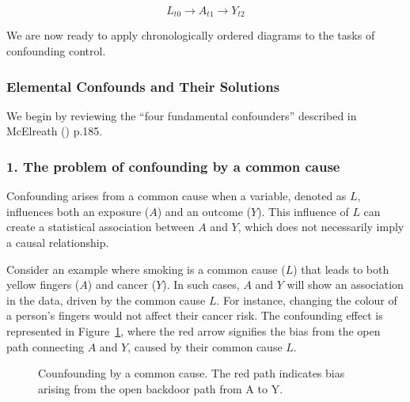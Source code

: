 \documentclass[
  singlecolumn,
  9pt]{article}
\begin{document}
\[L_{t0} \to A_{t1} \to Y_{t2}\]

We are now ready to apply chronologically ordered diagrams to the tasks
of confounding control.

\subsubsection{Elemental Confounds and Their
Solutions}\label{elemental-confounds-and-their-solutions}

We begin by reviewing the ``four fundamental confounders'' described in
McElreath () p.185.

\subsubsection{1. The problem of confounding by a common
cause}\label{the-problem-of-confounding-by-a-common-cause}

Confounding arises from a common cause when a variable, denoted as
\(L\), influences both an exposure (\(A\)) and an outcome (\(Y\)). This
influence of \(L\) can create a statistical association between \(A\)
and \(Y\), which does not necessarily imply a causal relationship.

Consider an example where smoking is a common cause (\(L\)) that leads
to both yellow fingers (\(A\)) and cancer (\(Y\)). In such cases, \(A\)
and \(Y\) will show an association in the data, driven by the common
cause \(L\). For instance, changing the colour of a person's fingers
would not affect their cancer risk. The confounding effect is
represented in Figure~\ref{fig-dag-common-cause}, where the red arrow
signifies the bias from the open path connecting \(A\) and \(Y\), caused
by their common cause \(L\).

\begin{figure}


\caption{\label{fig-dag-common-cause}Counfounding by a common cause. The
red path indicates bias arising from the open backdoor path from A to
Y.}

\end{figure}%
\end{document}
